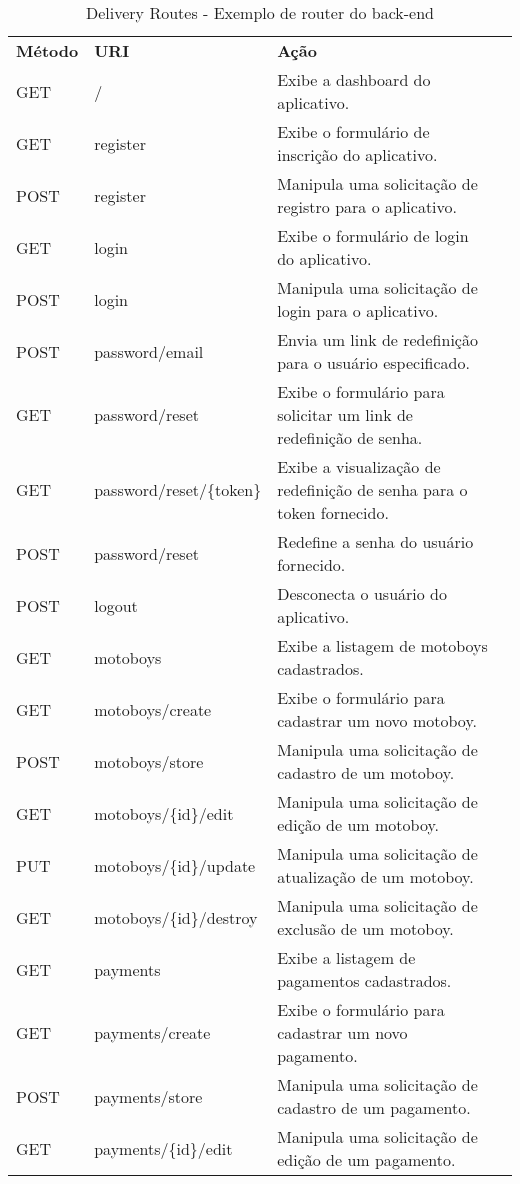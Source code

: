 \newpage
\begin{table}[H]
    \centering
    \caption{Delivery Routes - Exemplo de router do back-end
    \label{tab:drRoutes}}
\begin{tabular}{llp{9.2cm}l}
\textbf{Método} & \textbf{URI} & \textbf{Ação} \\
GET & / & Exibe a dashboard do aplicativo. \\
GET & register & Exibe o formulário de inscrição do aplicativo. \\
POST & register & Manipula uma solicitação de registro para o aplicativo. \\
GET & login & Exibe o formulário de login do aplicativo. \\
POST & login & Manipula uma solicitação de login para o aplicativo. \\
POST & password/email & Envia um link de redefinição para o usuário especificado. \\
GET & password/reset & Exibe o formulário para solicitar um link de redefinição de senha. \\
GET & password/reset/\{token\} & Exibe a visualização de redefinição de senha para o token fornecido. \\
POST & password/reset & Redefine a senha do usuário fornecido. \\
POST & logout & Desconecta o usuário do aplicativo. \\
GET & motoboys & Exibe a listagem de motoboys cadastrados. \\
GET & motoboys/create & Exibe o formulário para cadastrar um novo motoboy. \\
POST & motoboys/store & Manipula uma solicitação de cadastro de um motoboy. \\
GET & motoboys/\{id\}/edit & Manipula uma solicitação de edição de um motoboy. \\
PUT & motoboys/\{id\}/update & Manipula uma solicitação de atualização de um motoboy. \\
GET & motoboys/\{id\}/destroy & Manipula uma solicitação de exclusão de um motoboy. \\
GET & payments & Exibe a listagem de pagamentos cadastrados. \\
GET & payments/create & Exibe o formulário para cadastrar um novo pagamento. \\
POST & payments/store & Manipula uma solicitação de cadastro de um pagamento. \\
GET & payments/\{id\}/edit & Manipula uma solicitação de edição de um pagamento. \\

\end{tabular}
\end{table}
